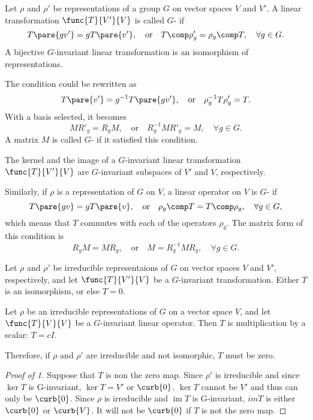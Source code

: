 \documentclass[hidelinks]{article}
\let\oldgloss\gloss
\def\gloss#1{\textnormal{\textbf{\oldgloss{#1}}}}
\DeclareMathOperator{\im}{im}
\begin{document}
Let $\rho$ and $\rho'$ be representations of a group $G$ on vector spaces $V$ and $V'$. A linear transformation $\func{T}{V'}{V}$ is called $G$- if
\[ T\pare{gv'} = gT\pare{v'},\quad \text{or}\quad T\comp \rho'_g = \rho_g\comp T,\quad \forall g \in G. \]
A bijective $G$-invariant linear transformation is an isomorphism of representations.
\par
The condition could be rewritten as
\[ T\pare{v'} = g^{-1}T\pare{gv'},\quad \text{or}\quad \rho_g^{-1} T \rho'_g = T. \]
With a basis selected, it becomes
\[ MR'_g = R_gM,\quad \text{or}\quad R_g^{-1}MR'_g = M,\quad \forall g\in G. \]
A matrix $M$ is called $G$- if it satisfied this condition.
\begin{lemma}
    The kernel and the image of a $G$-invariant linear transformation $\func{T}{V'}{V}$ are $G$-invariant subspaces of $V'$ and $V$, respectively.
\end{lemma}
\par
Similarly, if $\rho$ is a representation of $G$ on $V$, a linear operator on $V$ is $G$- if
\[ T\pare{gv} = gT\pare{v},\quad \text{or}\quad \rho_g\comp T = T\comp \rho_g,\quad \forall g\in G, \]
which means that $T$ commutes with each of the operators $\rho_g$. The matrix form of this condition is
\[ R_g M = M R_g,\quad \text{or}\quad M = R_g^{-1}MR_g,\quad \forall g\in G. \]
\begin{resume}
    \begin{theorem}
        \mbox{}
        \begin{cenum}
            \item Let $\rho$ and $\rho'$ be irreducible representaions of $G$ on vector spaces $V$ and $V'$, respectively, and let $\func{T}{V'}{V}$ be a $G$-invariant transformation. Either $T$ is an isomorphism, or else $T = 0$.
            \item Let $\rho$ be an irreducible representations of $G$ on a vector space $V$, and let $\func{T}{V}{V}$ be a $G$-invariant linear operator. Then $T$ is multiplication by a scalar: $T = cI$.
        \end{cenum}
    \end{theorem}
\end{resume}
Therefore, if $\rho$ and $\rho'$ are irreducible and not isomorphic, $T$ must be zero.
\begin{proof}[Proof of 1]
    Suppose that $T$ is non the zero map. Since $\rho'$ is irreducible and since $\ker T$ is G-invariant, $\ker T = V'$ or $\curb{0}$. $\ker T$ cannot be $V'$ and thus can only be $\curb{0}$. Since $\rho$ is irreducible and $\im T$ is G-invariant, $im T$ is either $\curb{0}$ or $\curb{V}$. It will not be $\curb{0}$ if $T$ is not the zero map.
\end{proof}
\end{document}
